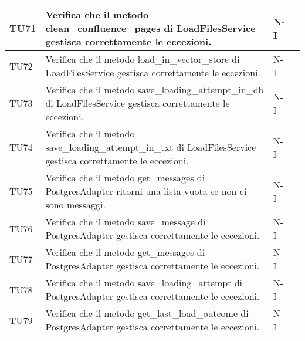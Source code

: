 \begin{table}[h!]
\begin{tabularx}{\textwidth}{|p{}|X|p{}|p{}|}
    TU71 & Verifica che il metodo clean\_confluence\_pages di LoadFilesService gestisca correttamente le eccezioni. &  N-I \\ \hline
    TU72 & Verifica che il metodo load\_in\_vector\_store di LoadFilesService gestisca correttamente le eccezioni. &  N-I \\ \hline
    TU73 & Verifica che il metodo save\_loading\_attempt\_in\_db di LoadFilesService gestisca correttamente le eccezioni. &  N-I \\ \hline
    TU74 & Verifica che il metodo save\_loading\_attempt\_in\_txt di LoadFilesService gestisca correttamente le eccezioni. &  N-I \\ \hline
    TU75 & Verifica che il metodo get\_messages di PostgresAdapter ritorni una lista vuota se non ci sono messaggi. &  N-I \\ \hline
    TU76 & Verifica che il metodo save\_message di PostgresAdapter gestisca correttamente le eccezioni. &  N-I \\ \hline
    TU77 & Verifica che il metodo get\_messages di PostgresAdapter gestisca correttamente le eccezioni. &  N-I \\ \hline
    TU78 & Verifica che il metodo save\_loading\_attempt di PostgresAdapter gestisca correttamente le eccezioni. &  N-I \\ \hline
    TU79 & Verifica che il metodo get\_last\_load\_outcome di PostgresAdapter gestisca correttamente le eccezioni. &  N-I \\ \hline

    \end{tabularx}
\end{table}

\newpage

